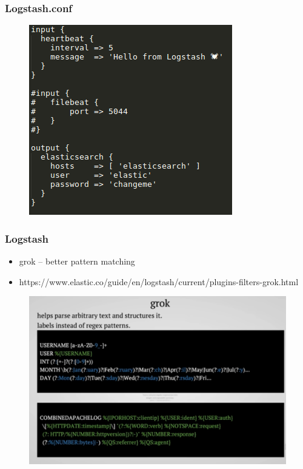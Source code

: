 \documentclass[11pt]{beamer}
\begin{document}
\begin{frame}
\frametitle{Logstash.conf}
\begin{figure}[h]
	\includegraphics[scale=1]{images/logstash1}
\end{figure}
\end{frame}

\begin{frame}
\frametitle{Logstash}
\begin{itemize}
	\item grok – better pattern matching
	\item https://www.elastic.co/guide/en/logstash/current/plugins-filters-grok.html
\end{itemize}
\begin{figure}[h]
	\includegraphics[scale=.3]{images/grok1}
\end{figure}
\end{frame}
\end{document}

